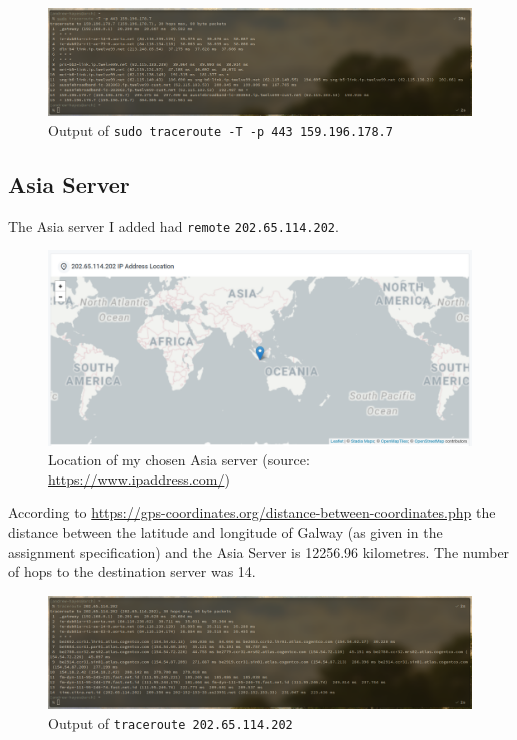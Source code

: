 \documentclass[a4paper]{article}
\begin{document}
\begin{figure}[H]
    \centering
    \includegraphics[width=\textwidth]{./images/australiatraceroute.png}
    \caption{Output of \texttt{sudo traceroute -T -p 443 159.196.178.7}}
\end{figure}

\subsection{Asia Server}
The Asia server I added had \verb|remote| \verb|202.65.114.202|.

\begin{figure}[H]
    \centering
    \includegraphics[width=\textwidth]{./images/asiaserverloc.png}
    \caption{Location of my chosen Asia server (source: \url{https://www.ipaddress.com/})}
\end{figure}

According to \url{https://gps-coordinates.org/distance-between-coordinates.php} the distance between the latitude and longitude of Galway (as given in the assignment specification) and the Asia Server is 12256.96 kilometres.
The number of hops to the destination server was 14.

\begin{figure}[H]
    \centering
    \includegraphics[width=\textwidth]{./images/asiatraceroute.png}
    \caption{Output of \texttt{traceroute 202.65.114.202}}
\end{figure}
\end{document}
